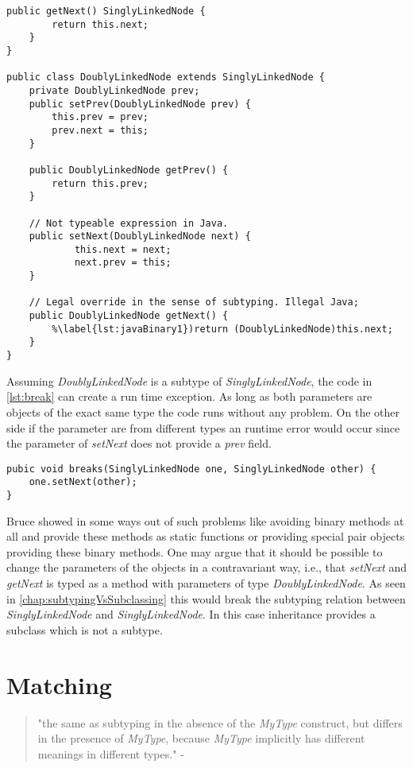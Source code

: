 \begin{lstlisting}[caption={Illegal subtyping of binary methods in Java},label={lst:javaBinary}]
	public getNext() SinglyLinkedNode {
		return this.next;
	}
}

public class DoublyLinkedNode extends SinglyLinkedNode {
	private DoublyLinkedNode prev;
	public setPrev(DoublyLinkedNode prev) {
		this.prev = prev;
		prev.next = this;
	}

	public DoublyLinkedNode getPrev() {
		return this.prev;
	}
	
	// Not typeable expression in Java.
	public setNext(DoublyLinkedNode next) {
			this.next = next;
			next.prev = this;
	}

	// Legal override in the sense of subtyping. Illegal Java;
	public DoublyLinkedNode getNext() {
		%\label{lst:javaBinary1})return (DoublyLinkedNode)this.next;
	}
}
\end{lstlisting}

Assuming \emph{DoublyLinkedNode} is a subtype of \emph{SinglyLinkedNode},
the code in \autoref{lst:break} can create a run time exception. As
long as both parameters are objects of the exact same type the code runs
without any problem. On the other side if the parameter are from different
types an runtime error would occur since the parameter of \emph{setNext}
does not provide a \emph{prev} field.

\begin{lstlisting}[label={lst:break},caption={Breaking a doubly linked node}]
pubic void breaks(SinglyLinkedNode one, SinglyLinkedNode other) {
	one.setNext(other);
}
\end{lstlisting}

Bruce showed in \cite{bruce_binary_1995} some ways out of such problems
like avoiding binary methods at all and provide these methods as static
functions or providing special pair objects providing these binary
methods. One may argue that it should be possible to change the parameters
of the objects in a contravariant way, i.e., that \emph{setNext}
and \emph{getNext} is typed as a method with parameters of type
\emph{DoublyLinkedNode}. As seen in \autoref{chap:subtypingVsSubclassing}
this would break the subtyping relation between \emph{SinglyLinkedNode}
and \emph{SinglyLinkedNode}. In this case inheritance provides a subclass
which is not a subtype.

\section{Matching}
\begin{quotation}
"the same as subtyping in the absence of the \emph{MyType}
construct, but differs in the presence of \emph{MyType}, because
\emph{MyType} implicitly has different meanings in different types." -
\cite{bruce_foundations_2002}
\end{quotation}

